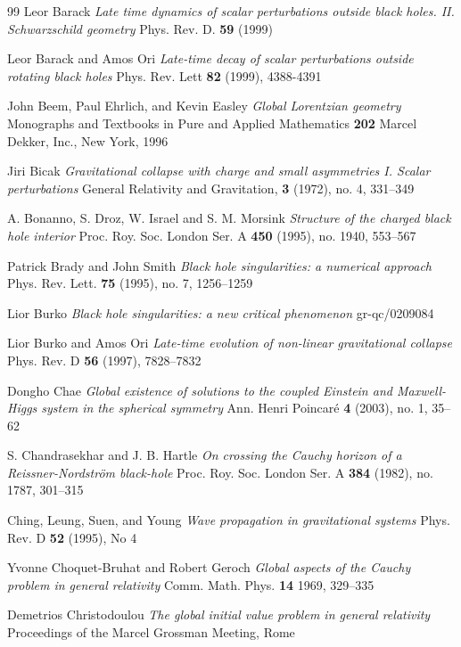 \begin{thebibliography}{99}
 Leor Barack \emph{Late time dynamics of scalar perturbations
outside black holes. II. Schwarzschild geometry} Phys. Rev. D. {\bf 59}
(1999)

 Leor Barack and Amos Ori \emph{Late-time decay
of scalar perturbations outside rotating black holes}
Phys. Rev. Lett {\bf 82} (1999), 4388-4391

 John Beem, Paul Ehrlich, and Kevin Easley
\emph{Global Lorentzian geometry} 
Monographs and Textbooks in Pure and Applied Mathematics {\bf 202}
Marcel Dekker, Inc., New York, 1996

 Jiri Bicak \emph{Gravitational collapse
with charge and small asymmetries I. Scalar perturbations}
General Relativity and Gravitation, {\bf 3} (1972), no. 4, 331--349

 A. Bonanno, S. Droz, W. Israel and
S. M. Morsink \emph{Structure of the charged black hole
interior} Proc. Roy. Soc. London Ser. A {\bf 450} 
(1995), no. 1940, 553--567

 Patrick Brady and John Smith
\emph{Black hole singularities: a numerical approach}
Phys. Rev. Lett. {\bf 75} (1995), no. 7, 1256--1259

 Lior Burko \emph{Black hole singularities:
a new critical phenomenon} gr-qc/0209084

 Lior Burko and Amos Ori
\emph{Late-time evolution of non-linear gravitational collapse}
Phys. Rev. D {\bf 56} (1997), 7828--7832

 Dongho Chae \emph{Global existence
of solutions to the coupled Einstein and Maxwell-Higgs system
in the spherical symmetry} Ann. Henri Poincar\'e
{\bf 4} (2003), no. 1, 35--62

 S. Chandrasekhar and J. B. Hartle
\emph{On crossing the Cauchy horizon of a Reissner-Nordstr\"om black-hole}
Proc. Roy. Soc. London Ser. A {\bf 384} (1982), no. 1787, 301--315

 Ching, Leung, Suen, and Young \emph{Wave propagation
in gravitational systems} Phys. Rev. D {\bf 52} (1995), No 4

 Yvonne Choquet-Bruhat and Robert Geroch
\emph{Global aspects of the Cauchy problem in general relativity}
Comm. Math. Phys. {\bf 14} 1969, 329--335

 Demetrios Christodoulou \emph{The global initial value
problem in general relativity} Proceedings of the Marcel Grossman
Meeting, Rome


\end{thebibliography}
